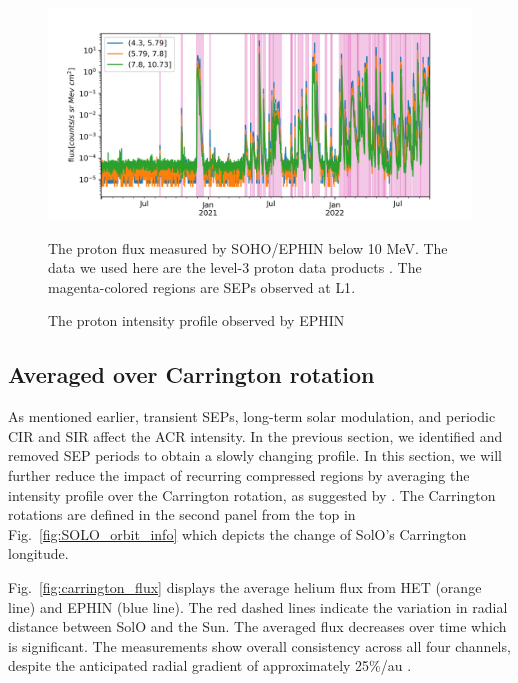 \begin{figure}[!htb]
    \centering
    \includegraphics[width = \textwidth]{images/ACR/SOLO-EPHIN-l3i-log2+6-proton-6H-V2.png}
    \caption{The proton intensity profile observed by \ac{EPHIN}}{The proton flux measured by \ac{SOHO}/\ac{EPHIN} below 10 MeV. The data we used here are the level-3 proton data products \citep{kuehl2020JSWSC}. The magenta-colored regions are \acp{SEP} observed at \ac{L1}.}
    \label{Fig:SOHO_EPHIN_Proton_flux}
\end{figure}

\subsection*{Averaged over Carrington rotation}

As mentioned earlier, transient \acp{SEP}, long-term solar modulation, and periodic \ac{CIR} and \ac{SIR} affect the \ac{ACR} intensity. In the previous section, we identified and removed \ac{SEP} periods to obtain a slowly changing profile. In this section, we will further reduce the impact of recurring compressed regions by averaging the intensity profile over the Carrington rotation, as suggested by \citep{Rankin2021ApJ}. The Carrington rotations are defined in the second panel from the top in Fig.~\ref{fig:SOLO_orbit_info} which depicts the change of \ac{SolO}'s Carrington longitude. 


Fig.~\ref{fig:carrington_flux} displays the average helium flux from \ac{HET} (orange line) and \ac{EPHIN} (blue line). The red dashed lines indicate the variation in radial distance between \ac{SolO} and the Sun. The averaged flux decreases over time which is significant. The measurements show overall consistency across all four channels, despite the anticipated radial gradient of approximately 25\%/au \citep{Rankin2021ApJ}.

